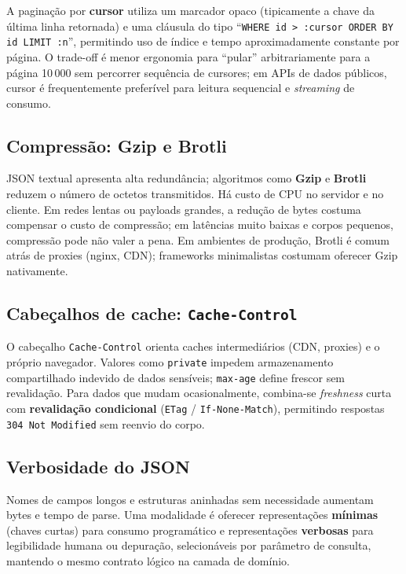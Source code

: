 \documentclass[12pt,a4paper]{article}
\begin{document}
A paginação por \textbf{cursor} utiliza um marcador opaco (tipicamente a chave da última linha retornada) e uma cláusula do tipo ``\texttt{WHERE id > :cursor ORDER BY id LIMIT :n}'', permitindo uso de índice e tempo aproximadamente constante por página. O trade-off é menor ergonomia para ``pular'' arbitrariamente para a página 10\,000 sem percorrer sequência de cursores; em APIs de dados públicos, cursor é frequentemente preferível para leitura sequencial e \emph{streaming} de consumo.

\subsection{Compressão: Gzip e Brotli}

JSON textual apresenta alta redundância; algoritmos como \textbf{Gzip} e \textbf{Brotli} reduzem o número de octetos transmitidos. Há custo de CPU no servidor e no cliente. Em redes lentas ou payloads grandes, a redução de bytes costuma compensar o custo de compressão; em latências muito baixas e corpos pequenos, compressão pode não valer a pena. Em ambientes de produção, Brotli é comum atrás de proxies (nginx, CDN); frameworks minimalistas costumam oferecer Gzip nativamente.

\subsection{Cabeçalhos de cache: \texttt{Cache-Control}}

O cabeçalho \texttt{Cache-Control} orienta caches intermediários (CDN, proxies) e o próprio navegador. Valores como \texttt{private} impedem armazenamento compartilhado indevido de dados sensíveis; \texttt{max-age} define frescor sem revalidação. Para dados que mudam ocasionalmente, combina-se \emph{freshness} curta com \textbf{revalidação condicional} (\texttt{ETag} / \texttt{If-None-Match}), permitindo respostas \texttt{304 Not Modified} sem reenvio do corpo.

\subsection{Verbosidade do JSON}

Nomes de campos longos e estruturas aninhadas sem necessidade aumentam bytes e tempo de parse. Uma modalidade é oferecer representações \textbf{mínimas} (chaves curtas) para consumo programático e representações \textbf{verbosas} para legibilidade humana ou depuração, selecionáveis por parâmetro de consulta, mantendo o mesmo contrato lógico na camada de domínio.
\end{document}
